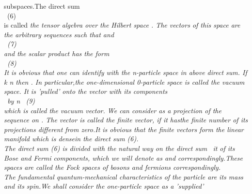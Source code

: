 \documentclass[a4paper,12pt] {article}
\begin{document}
subspaces.\rm The direct sum  \\\coordHE{}\ (6)\\ is called
\it the tensor algebra over the Hilbert space  \coordHE{}. \rm The vectors  of this space are the arbitrary
sequences \coordHE{}  such that  \coordHE{}
and \\\coordHE{} \   (7)\\
 and the scalar product has the form \\\coordHE{} \ (8)
 \\ It is obvious that one can identify  \coordHE{}  with the n-particle space in above
direct sum. If  k \myHighlight{$\neq$}\coordHE{} n  then  \coordHE{}. In particular,the  one-dimensional 0-particle  space
\coordHE{} is called  \it the vacuum space. \rm It is \it  'pulled'  \rm onto  the vector
 \coordHE{} with its components
\\\coordHE{} \ by n\coordHE{} \    (9) \\which is called  \it the vacuum vector. \rm
We can consider \coordHE{}  as a projection of the sequence \myHighlight{$\Phi$}\coordHE{} on \coordHE{}.
The vector \myHighlight{$\Phi$}\coordHE{}  is called \it the  finite vector, \rm if it has\it  the finite number of its projections
 \coordHE{} \it different from zero.\rm  It is obvious that the finite vectors form the linear manifold which is
\it dense\rm  in the direct sum (6).\\ The direct sum (6) is divided with the natural way on the direct sum
\ it of its Bose and Fermi components, \rm which we will denote as
 \coordHE{} and
\coordHE{} correspondingly.These spaces are called  \it the Fock spaces of bosons and
fermions \rm  correspondingly.\\ The fundamental quantum-mechanical characteristics of the particle are
\it  its mass and its spin.\rm We shall consider the one-particle space \coordHE{} as a 'supplied'
\end{document}
